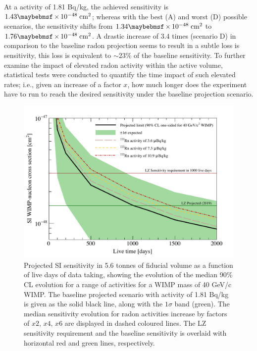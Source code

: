 {\begin{figure}[H!]
    \label{fig:radon_vs_sensitivity}
\end{figure}
%

At a \RnTTT{} activity of 1.81 \micro{}Bq/kg, the achieved sensitivity is $1.43 \times 10^{-48} \; \MathText{cm}^2$; whereas with the best (A) and worst (D) possible scenarios, the sensitivity shifts from $1.34 \times 10^{-48} \; \MathText{cm}^2$ to $1.76 \times 10^{-48} \; \MathText{cm}^2$. A drastic increase of 3.4 times (scenario D) in comparison to the baseline radon projection seems to result in a subtle loss is sensitivity, this loss is equivalent to $\sim23\%$ of the baseline sensitivity. To further examine the impact of elevated radon activity within the active volume, statistical tests were conducted to quantify the time impact of such elevated rates; i.e., given an increase of a factor $x$, how much longer does the experiment have to run to reach the desired sensitivity under the baseline projection scenario. 

%
\begin{figure}[H!]
    \centering
    \includegraphics[scale=0.8]{Chapter_5/Figures/sensitivity_studies/sensitivity_vs_time_radon.pdf}
    \caption[Projected SI sensitivity in 5.6 tonnes of fiducial volume as a function of live days of data taking, showing the evolution of the median 90\% CL evolution for a range of \RnTTT{} activities for a WIMP mass of 40 GeV/c\squared{} WIMP.]%
    {Projected SI sensitivity in 5.6 tonnes of fiducial volume as a function of live days of data taking, showing the evolution of the median 90\% CL evolution for a range of \RnTTT{} activities for a WIMP mass of 40 GeV/c\squared{} WIMP. The baseline projected scenario with \RnTTT{} activity of 1.81 \micro{}Bq/kg is given as the solid black line, along with the $1\sigma$ band (green). The median sensitivity evolution for radon activities increase by factors of $x2$, $x4$, $x6$ are displayed in dashed coloured lines. The LZ sensitivity requirement and the baseline sensitivity is overlaid with horizontal red and green lines, respectively.}
    \label{fig:radon_vs_time}
\end{figure}
%

}
